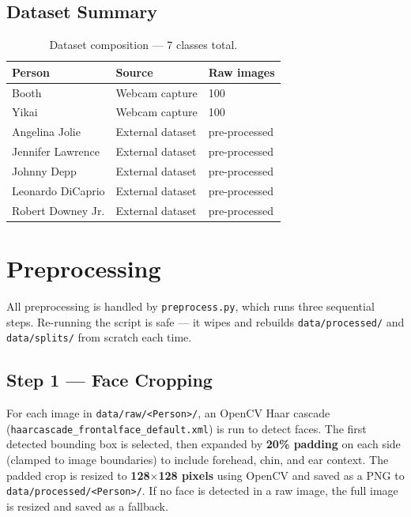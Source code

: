\documentclass[12pt,a4paper]{article}
\begin{document}
\subsection{Dataset Summary}

\begin{table}[H]
  \centering
  \begin{tabular}{lll}
    \toprule
    \textbf{Person} & \textbf{Source} & \textbf{Raw images} \\
    \midrule
    Booth             & Webcam capture   & 100 \\
    Yikai             & Webcam capture   & 100 \\
    Angelina Jolie    & External dataset & pre-processed \\
    Jennifer Lawrence & External dataset & pre-processed \\
    Johnny Depp       & External dataset & pre-processed \\
    Leonardo DiCaprio & External dataset & pre-processed \\
    Robert Downey Jr. & External dataset & pre-processed \\
    \bottomrule
  \end{tabular}
  \caption{Dataset composition — 7 classes total.}
\end{table}

\section{Preprocessing}

All preprocessing is handled by \texttt{preprocess.py}, which runs three sequential steps. Re-running the script is safe — it wipes and rebuilds \texttt{data/processed/} and \texttt{data/splits/} from scratch each time.

\subsection{Step 1 — Face Cropping}

For each image in \texttt{data/raw/<Person>/}, an OpenCV Haar cascade (\texttt{haarcascade\_frontalface\_default.xml}) is run to detect faces. The first detected bounding box is selected, then expanded by \textbf{20\% padding} on each side (clamped to image boundaries) to include forehead, chin, and ear context. The padded crop is resized to \textbf{128$\times$128 pixels} using OpenCV and saved as a PNG to \texttt{data/processed/<Person>/}. If no face is detected in a raw image, the full image is resized and saved as a fallback.
\end{document}
